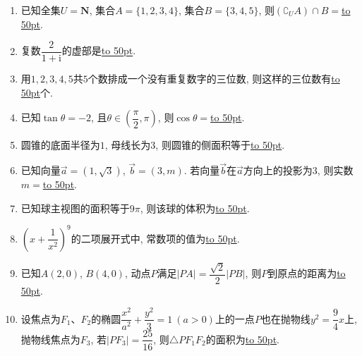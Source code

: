 \documentclass[10pt,a4paper]{article}
\newcommand{\blank}[1]{\underline{\hbox to #1pt{}}}
\begin{document}
\begin{enumerate}[1.]

\item 已知全集$U=\mathbf{N}$, 集合$A=\{1,2,3,4\}$, 集合$B=\{3,4,5\}$, 则$(\complement_U A)\cap B=$\blank{50}.
\item 复数$\dfrac2{1+\mathrm{i}}$的虚部是\blank{50}.
\item 用$1,2,3,4,5$共$5$个数排成一个没有重复数字的三位数, 则这样的三位数有\blank{50}个.
\item 已知$\tan \theta =-2$, 且$\theta \in (\dfrac\pi 2,\pi)$, 则$\cos\theta=$\blank{50}.
\item 圆锥的底面半径为$1$, 母线长为$3$, 则圆锥的侧面积等于\blank{50}.
\item 已知向量$\overrightarrow{a}=(1,\sqrt{3})$, $\overrightarrow{b}=(3,m)$. 若向量$\overrightarrow{b}$在$\overrightarrow{a}$方向上的投影为$3$, 则实数$m=$\blank{50}.
\item 已知球主视图的面积等于$9\pi$, 则该球的体积为\blank{50}.
\item $(x+\dfrac{1}{x^2})^9$的二项展开式中, 常数项的值为\blank{50}.
\item 已知$A(2,0)$, $B(4,0)$, 动点$P$满足$|PA|=\dfrac{\sqrt2} 2|PB|$, 则$P$到原点的距离为\blank{50}.
\item 设焦点为$F_1$、$F_2$的椭圆$\dfrac{x^2}{a^2}+\dfrac{y^2}3=1 \ (a>0)$上的一点$P$也在抛物线$y^2=\dfrac94x$上, 抛物线焦点为$F_3$, 若$|PF_3|=\dfrac{25}{16}$, 则$\triangle PF_1F_2$的面积为\blank{50}.



\end{enumerate}
\end{document}
